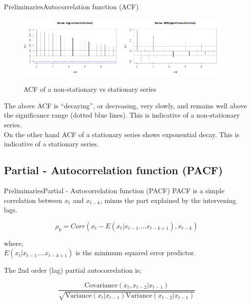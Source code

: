 \documentclass{beamer}
\begin{document}
\begin{frame}{Preliminaries}{Autocorrelation function (ACF)}

\begin{figure}
	\includegraphics[width=0.475\textwidth]{ACF_log}
	\hfill
	\includegraphics[width=0.475\textwidth]{ACF_logdiff}
	\caption{ACF of a non-stationary  vs stationary series}
\end{figure}
\small {The above ACF is “decaying”, or decreasing, very slowly, and remains well above the significance range (dotted blue lines). This is indicative of a non-stationary series.\\
	
On the other hand ACF of a stationary series shows exponential decay. This is indicative of a stationary series.}

\end{frame}

\subsection{Partial - Autocorrelation function (PACF)}
\begin{frame}{Preliminaries}{Partial - Autocorrelation function (PACF)}
PACF is a simple correlation between $ x_t $ and $ x_{t-k} $, minus the part explained by the intervening lags. 	

\begin{equation*}
\rho_k = Corr (x_t - E(x_t |x_{t-1} .... x_{t-k+1}),x_{t-k})
\end{equation*}

where; \\
$ E(x_t |x_{t-1} .... x_{t-k+1}) $ is the minimum squared error predictor. 

The 2nd order (lag) partial autocorrelation is; 

\begin{equation}
\frac{\text{Covariance}(x_t, x_{t-2}| x_{t-1})}{\sqrt{\text{Variance}(x_t|x_{t-1})\text{Variance}(x_{t-2}|x_{t-1})}}
\end{equation}
	
\end{frame}	
\end{document}
